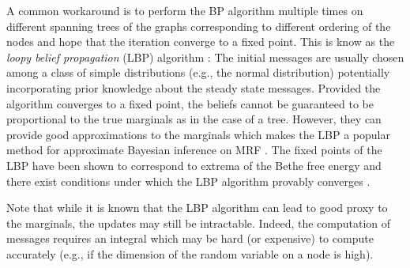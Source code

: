 A common workaround is to perform the BP algorithm multiple times on different spanning trees of the graphs corresponding to different ordering of the nodes and hope that the iteration converge to a fixed point. This is know as the \emph{loopy belief propagation} (LBP) algorithm \citep{pearl88, yedidia02}:
%
%
The initial messages are usually chosen among a class of simple distributions (e.g., the normal distribution) potentially incorporating prior knowledge about the steady state messages. 
Provided the algorithm converges to a fixed point, the beliefs cannot be guaranteed to be proportional to the true marginals as in the case of a tree. However, they can provide good approximations to the marginals which makes the LBP a popular method for approximate Bayesian inference on MRF \citep{sudderth03}. The fixed points of the LBP have been shown to correspond to extrema of the Bethe free energy \cite{yedidia02} and there exist conditions under which the LBP algorithm provably converges \citep{heskes04,ihler05}.

Note that while it is known that the LBP algorithm can lead to good proxy to the marginals, the updates may still be intractable. Indeed, the computation of messages requires an integral which may be hard (or expensive) to compute accurately (e.g., if the dimension of the random variable on a node is high).








